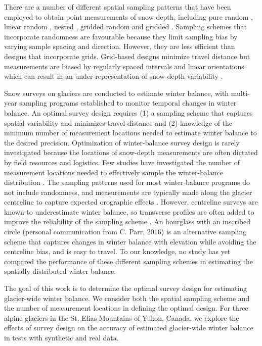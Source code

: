 \documentclass[twocolumn,letterpaper]{igs}
\begin{document}
There are a number of different spatial sampling patterns that have been employed to obtain point measurements of snow depth, including pure random \citep[e.g.][]{Elder1991}, linear random \cite[e.g.][]{Shea2010}, nested \citep[e.g.][]{Schweizer2008}, gridded random \citep[e.g.][]{Bellaire2008, Elder2009, Bellaire2011} and gridded \citep[e.g.][]{Molotch2005a, Kronholm2007, Lopez2011}. Sampling schemes that incorporate randomness are favourable because they limit sampling bias by varying sample spacing and direction. However, they are less efficient than designs that incorporate grids. Grid-based designs minimize travel distance but measurements are biased by regularly spaced intervals and linear orientations which can result in an under-representation of  snow-depth variability \citep{Kronholm2007}.

Snow surveys on glaciers are conducted to estimate winter balance, with multi-year sampling programs established to monitor temporal changes in winter balance. An optimal survey design requires (1) a sampling scheme that captures spatial variability and minimizes travel distance and (2) knowledge of the minimum number of measurement locations needed to estimate winter balance to the desired precision.  Optimization of winter-balance survey design is rarely investigated because the locations of snow-depth measurements are often dictated by field resources and logistics. 
Few studies have investigated the number of measurement locations needed to effectively sample the winter-balance distribution \citep[c.f.][]{Fountain1999,Walmsley2015}. The sampling patterns used for most winter-balance programs do not include randomness, and measurements are typically made along the glacier centreline \citep[e.g.][]{Kaser2003} to capture expected orographic effects \citep[e.g.][]{Grunewald2014}. However, centreline surveys are known to underestimate winter balance, so transverse profiles are often added to improve the reliability of the sampling scheme \citep[e.g.][]{Walmsley2015}. An hourglass with an inscribed circle (personal communication from C. Parr, 2016) is an alternative sampling scheme that captures changes in winter balance with elevation while avoiding the centreline bias, and is easy to travel. To our knowledge, no study has yet compared the performance of these different sampling schemes in estimating the spatially distributed winter balance.

The goal of this work is to determine the optimal survey design for estimating glacier-wide winter balance. We consider both the spatial sampling scheme and the number of measurement locations in defining the optimal design. For three alpine glaciers in the St. Elias Mountains of Yukon, Canada, we explore the effects of survey design on the accuracy of estimated glacier-wide winter balance in tests with synthetic and real data.
\end{document}
